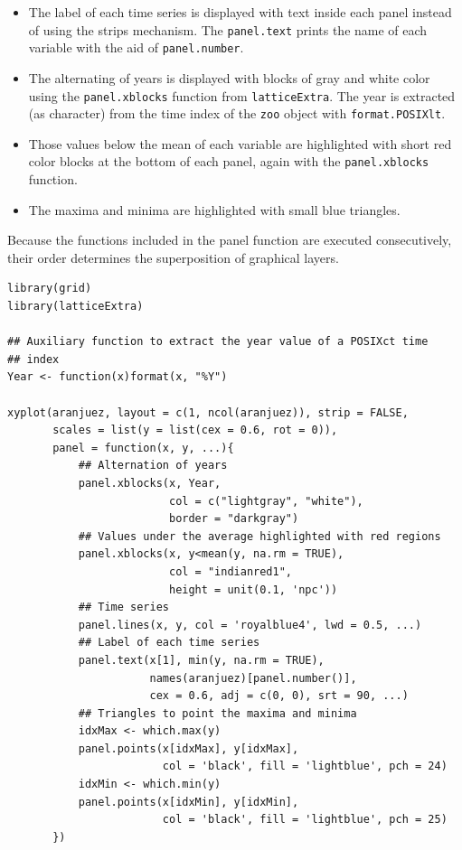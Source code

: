 \begin{itemize}
\item The label of each time series is displayed with text inside each
panel instead of using the strips mechanism. The \texttt{panel.text}
prints the name of each variable with the aid of \texttt{panel.number}.
\item The alternating of years is displayed with blocks of gray and
white color using the \texttt{panel.xblocks} function from
\texttt{latticeExtra}. The year is extracted (as character) from the
time index of the \texttt{zoo} object with \texttt{format.POSIXlt}.
\item Those values below the mean of each variable are highlighted
with short red color blocks at the bottom of each panel, again
with the \texttt{panel.xblocks} function.
\item The maxima and minima are highlighted with small blue triangles.
\end{itemize}

Because the functions included in the panel function are executed
consecutively, their order determines the superposition of graphical
layers.



\lstset{language=r,label= ,caption= ,captionpos=b,numbers=none}
\begin{lstlisting}
library(grid)
library(latticeExtra)
  
## Auxiliary function to extract the year value of a POSIXct time
## index
Year <- function(x)format(x, "%Y")
  
xyplot(aranjuez, layout = c(1, ncol(aranjuez)), strip = FALSE,
       scales = list(y = list(cex = 0.6, rot = 0)),
       panel = function(x, y, ...){
           ## Alternation of years
           panel.xblocks(x, Year,
                         col = c("lightgray", "white"),
                         border = "darkgray")
           ## Values under the average highlighted with red regions
           panel.xblocks(x, y<mean(y, na.rm = TRUE),
                         col = "indianred1",
                         height = unit(0.1, 'npc'))
           ## Time series
           panel.lines(x, y, col = 'royalblue4', lwd = 0.5, ...)
           ## Label of each time series
           panel.text(x[1], min(y, na.rm = TRUE),
                      names(aranjuez)[panel.number()],
                      cex = 0.6, adj = c(0, 0), srt = 90, ...)
           ## Triangles to point the maxima and minima 
           idxMax <- which.max(y)
           panel.points(x[idxMax], y[idxMax],
                        col = 'black', fill = 'lightblue', pch = 24)
           idxMin <- which.min(y)
           panel.points(x[idxMin], y[idxMin],
                        col = 'black', fill = 'lightblue', pch = 25)
       })
\end{lstlisting}

